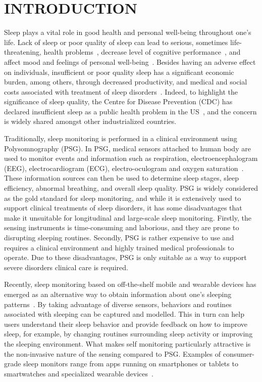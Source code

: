 \section{INTRODUCTION}\label{sec:1introduction}

Sleep plays a vital role in good health and personal well-being throughout one's life. Lack of sleep or poor quality of sleep can lead to serious, sometimes life-threatening, health problems~\cite{altena2008sleep,chandola2010effect,lallukka2016contribution}, decrease level of
cognitive performance~\cite{alhola07sleep,akerstedt07altered}, and affect mood and feelings of personal
well-being~\cite{paunio09longitudinal,pilcher97sleep}. Besides having an adverse effect on individuals, insufficient or poor quality sleep has a significant economic burden, among others, through decreased productivity, and medical and social costs associated with treatment of sleep disorders~\cite{hafner17why}. Indeed, to highlight the significance of sleep quality, the Centre for Disease Prevention (CDC) has declared insufficient sleep as a public health problem in the US~\cite{sleepreport}, and the concern is widely shared amongst other industrialized countries.


Traditionally, sleep monitoring is performed in a clinical environment using Polysomnography (PSG). In PSG, medical
sensors attached to human body are used to monitor events and information such as respiration, electroencephalogram (EEG), electrocardiogram (ECG), electro-oculogram and oxygen saturation~\cite{ebrahimi2008automatic,saper2005hypothalamic,oropesa1999sleep,langkvist2012sleep}. These information sources can then be used to determine sleep stages, sleep efficiency, abnormal breathing, and overall sleep quality. PSG is widely considered as the gold standard for sleep monitoring, and while it is extensively used to support clinical treatments of sleep disorders, it has some disadvantages that make it unsuitable for longitudinal and large-scale sleep monitoring. Firstly,  the sensing instruments is time-consuming and laborious, and they are prone to disrupting sleeping routines. Secondly, PSG is rather expensive to use and requires a clinical environment and highly trained medical professionals to operate. Due to these disadvantages, PSG is only suitable as a way to support severe disorders  clinical care is required.

Recently, sleep monitoring based on off-the-shelf mobile and wearable devices has emerged as an alternative way to obtain information about one's sleeping patterns~\cite{ko15consumer,shelgikar2016sleep}. By taking advantage of diverse sensors, behaviors and routines associated with sleeping can be captured and modelled. This in turn can help users understand their sleep behavior and provide feedback on how to improve sleep, for example, by changing routines surrounding sleep activity or improving the sleeping environment. What makes self monitoring particularly attractive is the non-invasive nature of the sensing compared to PSG. Examples of consumer-grade sleep monitors range from apps running on smartphones or tablets to smartwatches and specialized wearable devices~\cite{zeo,Jawbone,SleepAndroid,fitbit,gu2016sleep,sleepmonitor}.

